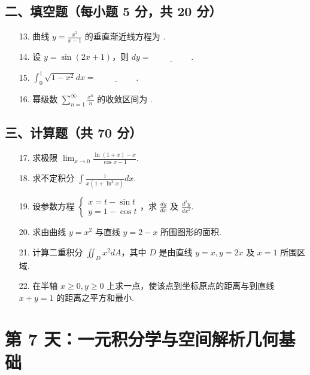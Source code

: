 \documentclass[11pt,a4paper]{article}
\begin{document}
\subsection*{二、填空题（每小题 5 分，共 20 分）}
\begin{enumerate}
    \item[13.] 曲线 $y = \frac{x^2}{x-1}$ 的垂直渐近线方程为 \underline{\hspace{2cm}}.
    \item[14.] 设 $y = \sin(2x+1)$，则 $dy = \underline{\hspace{2cm}}$.
    \item[15.] $\int_0^1 \sqrt{1-x^2} dx = \underline{\hspace{2cm}}$.
    \item[16.] 幂级数 $\sum_{n=1}^{\infty} \frac{x^n}{n}$ 的收敛区间为 \underline{\hspace{2cm}}.
\end{enumerate}
\subsection*{三、计算题（共 70 分）}
\begin{enumerate}
    \item[17.] 求极限 $\lim_{x \to 0} \frac{\ln(1+x) - x}{\cos x - 1}$.
    \item[18.] 求不定积分 $\int \frac{1}{x(1+\ln^2 x)} dx$.
    \item[19.] 设参数方程 $\begin{cases} x = t - \sin t \\ y = 1 - \cos t \end{cases}$，求 $\frac{dy}{dx}$ 及 $\frac{d^2y}{dx^2}$.
    \item[20.] 求由曲线 $y=x^2$ 与直线 $y=2-x$ 所围图形的面积.
    \item[21.] 计算二重积分 $\iint_D x^2 dA$，其中 $D$ 是由直线 $y=x, y=2x$ 及 $x=1$ 所围区域.
    \item[22.] 在半轴 $x \ge 0, y \ge 0$ 上求一点，使该点到坐标原点的距离与到直线 $x+y=1$ 的距离之平方和最小.
\end{enumerate}

\newpage

\section*{第 7 天：一元积分学与空间解析几何基础}
\end{document}
